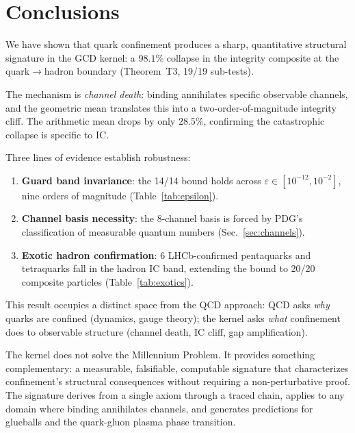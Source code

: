\documentclass[
  aps,
  prd,
  twocolumn,
  superscriptaddress,
  nofootinbib,
  floatfix
]{revtex4-2}
\newcommand{\eps}{\varepsilon}
\begin{document}
\section{Conclusions}\label{sec:conclusions}

We have shown that quark confinement produces a sharp,
quantitative structural signature in the GCD kernel: a $98.1\%$
collapse in the integrity composite at the quark$\to$hadron
boundary (Theorem~T3, 19/19 sub-tests).

The mechanism is \emph{channel death}: binding annihilates
specific observable channels, and the geometric mean translates
this into a two-order-of-magnitude integrity cliff.  The
arithmetic mean drops by only $28.5\%$, confirming the
catastrophic collapse is specific to IC.

Three lines of evidence establish robustness:
\begin{enumerate}
\item \textbf{Guard band invariance}: the 14/14 bound holds
  across $\eps \in [10^{-12}, 10^{-2}]$, nine orders of
  magnitude (Table~\ref{tab:epsilon}).
\item \textbf{Channel basis necessity}: the 8-channel basis is
  forced by PDG's classification of measurable quantum numbers
  (Sec.~\ref{sec:channels}).
\item \textbf{Exotic hadron confirmation}: 6 LHCb-confirmed
  pentaquarks and tetraquarks fall in the hadron IC band,
  extending the bound to 20/20 composite particles
  (Table~\ref{tab:exotics}).
\end{enumerate}

This result occupies a distinct space from the QCD approach:
QCD asks \emph{why} quarks are confined (dynamics, gauge theory);
the kernel asks \emph{what} confinement does to observable
structure (channel death, IC cliff, gap amplification).

The kernel does not solve the Millennium Problem.  It provides
something complementary: a measurable, falsifiable, computable
signature that characterizes confinement's structural consequences
without requiring a non-perturbative proof.  The signature derives
from a single axiom through a traced chain, applies to any domain
where binding annihilates channels, and generates predictions for
glueballs and the quark-gluon plasma phase transition.

\vspace{8pt}
\end{document}
